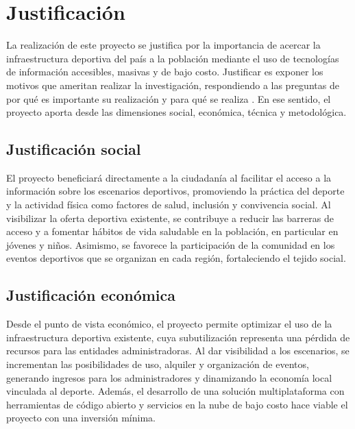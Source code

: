 
\section{Justificaci\'on}

La realizaci\'on de este proyecto se justifica por la importancia de acercar la
infraestructura deportiva del pa\'is a la poblaci\'on mediante el uso de
tecnolog\'ias de informaci\'on accesibles, masivas y de bajo costo. Justificar es
exponer los motivos que ameritan realizar la investigaci\'on, respondiendo a
las preguntas de por qu\'e es importante su realizaci\'on y para qu\'e se realiza
\citep{arias2012}. En ese sentido, el proyecto aporta desde las dimensiones
social, econ\'omica, t\'ecnica y metodol\'ogica.

\subsection{Justificaci\'on social}

El proyecto beneficiar\'a directamente a la ciudadan\'ia al facilitar el acceso a
la informaci\'on sobre los escenarios deportivos, promoviendo la pr\'actica del
deporte y la actividad f\'isica como factores de salud, inclusi\'on y convivencia
social. Al visibilizar la oferta deportiva existente, se contribuye a reducir
las barreras de acceso y a fomentar h\'abitos de vida saludable en la
poblaci\'on, en particular en j\'ovenes y ni\~nos. Asimismo, se favorece la
participaci\'on de la comunidad en los eventos deportivos que se organizan en
cada regi\'on, fortaleciendo el tejido social.

\subsection{Justificaci\'on econ\'omica}

Desde el punto de vista econ\'omico, el proyecto permite optimizar el uso de la
infraestructura deportiva existente, cuya subutilizaci\'on representa una
p\'erdida de recursos para las entidades administradoras. Al dar visibilidad a
los escenarios, se incrementan las posibilidades de uso, alquiler y
organizaci\'on de eventos, generando ingresos para los administradores y
dinamizando la econom\'ia local vinculada al deporte. Adem\'as, el desarrollo de
una soluci\'on multiplataforma con herramientas de c\'odigo abierto y servicios
en la nube de bajo costo hace viable el proyecto con una inversi\'on m\'inima.

